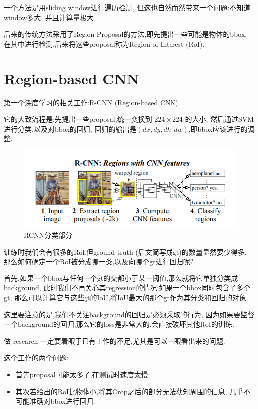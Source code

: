 一个方法是用sliding window进行遍历检测,
但这也自然而然带来一个问题:不知道window多大, 并且计算量极大

后来的传统方法采用了Region Proposal的方法,即先提出一些可能是物体的bbox,
在其中进行检测.后来将这些proposal称为Region of Interest (RoI).

\section{Region-based CNN}

第一个深度学习的相关工作\cite{RCNN}:R-CNN (Region-based CNN).

它的大致流程是:先提出一些proposal,统一变换到 $224\times 224$ 的大小,
然后通过SVM进行分类,以及对bbox的回归,
回归的输出是$(dx, dy, dh, dw)$,即bbox应该进行的调整.

\begin{figure}[htbp]
    \centering
    \includegraphics[scale=0.9]{figures/RCNN_classification.png}
    \caption{RCNN分类部分}
\end{figure}

训练时我们会有很多的RoI,但ground truth (后文简写成gt)的数量显然要少得多.
那么如何确定一个RoI被分成哪一类,以及向哪个gt进行回归呢?

首先,如果一个bbox与任何一个gt的交都小于某一阈值,那么就将它单独分类成background,
此时我们不再关心其regression的情况;如果一个bbox同时包含了多个gt,
那么可以计算它与这些gt的IoU,将IoU最大的那个gt作为其分类和回归的对象.

这里要注意的是,我们不关注background的回归是必须采取的行为,
因为如果要监督一个background的回归,那么它的loss是非常大的,会直接破坏其他RoI的训练.

做 research 一定要着眼于已有工作的不足,尤其是可以一眼看出来的问题.

这个工作的两个问题:
\begin{itemize}
    \item 首先proposal可能太多了,在测试时速度太慢.
    \item 其次若给出的RoI比物体小,将其Crop之后的部分无法获知周围的信息,
    几乎不可能准确对bbox进行回归.
\end{itemize}


